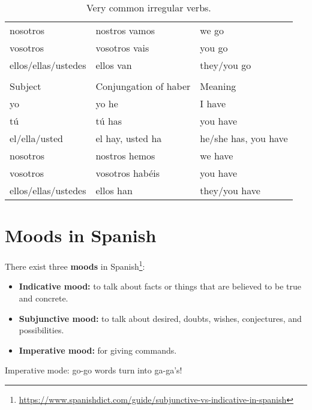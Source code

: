 \documentclass[a4paper,12pt]{article}
\begin{document}
\begin{table}[H]
\begin{tabular}{lll}
  nosotros            & nostros vamos                  & we go                \\
  vosotros            & vosotros vais                  & you go               \\
  ellos/ellas/ustedes & ellos van                      & they/you go          \\
  \midrule
                      &                                &                      \\
  Subject             & Conjungation of \textsf{haber} & Meaning              \\
  \toprule
  yo                  & yo he                          & I have               \\
  tú                  & tú has                         & you have             \\
  el/ella/usted       & el hay, usted ha               & he/she has, you have \\
  nosotros            & nostros hemos                  & we have              \\
  vosotros            & vosotros habéis                & you have             \\
  ellos/ellas/ustedes & ellos han                      & they/you have        \\
  \bottomrule
\end{tabular}
\caption{\label{tbl:} Very common irregular verbs.}
\end{table}

\pagebreak[4]

\section{Moods in Spanish}

There exist three \textbf{moods} in
Spanish\footnote{\url{https://www.spanishdict.com/guide/subjunctive-vs-indicative-in-spanish}}:

\begin{itemize}
\item \textbf{Indicative mood:} to talk about facts or things that are believed to be true and
  concrete.
\item \textbf{Subjunctive mood:} to talk about desired, doubts, wishes, conjectures, and
  possibilities.
\item \textbf{Imperative mood:} for giving commands.
\end{itemize}

Imperative mode: go-go words turn into ga-ga's!
\end{document}
